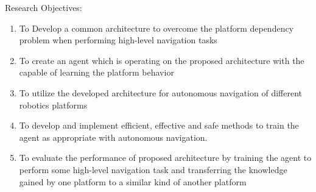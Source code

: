 
Research Objectives:



\begin{enumerate}
\item To Develop a common architecture to overcome the platform dependency problem when performing high-level navigation tasks

\item To create an agent which is operating on the proposed architecture with the capable of learning the platform behavior 

\item To utilize the developed architecture for autonomous navigation of different robotics platforms 

\item To develop and implement efficient, effective and safe methods to train the agent as appropriate with autonomous navigation.  

\item To evaluate the performance of proposed architecture by training the agent to perform some high-level navigation task and transferring the knowledge gained by one platform to a similar kind of another platform 


\end{enumerate}
